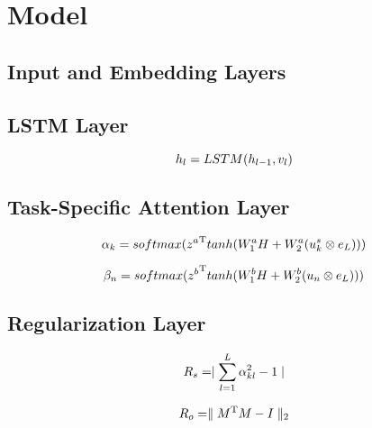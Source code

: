 \documentclass[11pt,a4paper]{article}
\begin{document}
\section{Model}

\subsection{Input and Embedding Layers}

\subsection{LSTM Layer}


\begin{equation} 
\setlength{\abovedisplayskip}{4pt}  %
\setlength{\belowdisplayskip}{4pt}  %
   h_l = LSTM(h_{l-1},v_l)
\end{equation}

\subsection{Task-Specific Attention Layer}


\begin{equation} 
\setlength{\abovedisplayskip}{4pt}  %
\setlength{\belowdisplayskip}{4pt}  %
    \alpha_k = softmax({z^a}^\mathrm{T}tanh(W_{1}^{a}{H} + W_{2}^{a}(u_k^{s}\otimes{e_L}))) 
  \label{equation_absa_att}
\end{equation}


\begin{equation} 
\setlength{\abovedisplayskip}{4pt}  %
\setlength{\belowdisplayskip}{4pt}  %
    \beta_n = softmax({z^b}^\mathrm{T}tanh(W_{1}^{b}{H} + W_{2}^{b}(u_n\otimes{e_L}))) 
  \label{equation_acd_att}
\end{equation}

\subsection{Regularization Layer}


\begin{equation} 
\setlength{\abovedisplayskip}{4pt}  %
\setlength{\belowdisplayskip}{4pt}  %
    R_s = \mid\sum\limits_{l=1}^L{\alpha_{kl}^{2}} - 1\mid
    \label{equation:sparse_reg}
\end{equation}


\begin{equation}
\setlength{\abovedisplayskip}{4pt}  %
\setlength{\belowdisplayskip}{4pt}  %
	R_o = \parallel{M^{\mathrm{T}}}M - I\parallel_2
\end{equation}
\end{document}
